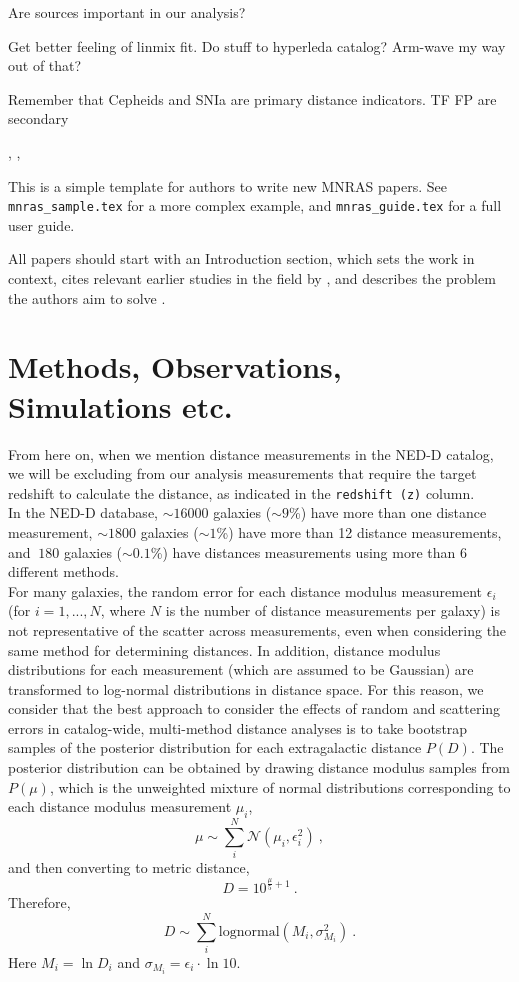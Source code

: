 \documentclass[a4paper,fleqn,usenatbib]{mnras}
\begin{document}
Are \citet{2mass} sources important in our analysis?

Get better feeling of linmix fit. Do stuff to hyperleda catalog? Arm-wave my way out of that?

Remember that Cepheids and SNIa are primary distance indicators. TF FP are secondary 


\citet{tf07dist}



 \citet{chaparro18}, \citet{tecciencia}, \citet{gelmanppd} \citet{brooks} \citet{tforig}



This is a simple template for authors to write new MNRAS papers.
See \texttt{mnras\_sample.tex} for a more complex example, and \texttt{mnras\_guide.tex}
for a full user guide.

All papers should start with an Introduction section, which sets the work
in context, cites relevant earlier studies in the field by \citet{photred2},
and describes the problem the authors aim to solve \citep[e.g.][]{photred1}.

\section{Methods, Observations, Simulations etc.}

From here on, when we mention distance measurements in the NED-D catalog, we will be excluding from our analysis measurements that require the target redshift to calculate the distance, as indicated in the \texttt{redshift (z)} column.\\

In the NED-D database, $\sim16000$ galaxies ($\sim9$\%) have more than one distance measurement, $\sim1800$ galaxies ($\sim1$\%) have more than 12  distance measurements, and $~180$ galaxies ($\sim0.1$\%) have distances measurements using more than 6 different methods. \\



For many galaxies, the random error for each distance modulus measurement $\epsilon_i$ (for $i=1,...,N$, where $N$ is the number of distance measurements per galaxy) is not representative of the scatter across measurements, even when considering the same method for determining distances. In addition, distance modulus distributions for each measurement (which are assumed to be Gaussian) are transformed to log-normal distributions in distance space. For this reason, we consider that the best approach to consider the effects of random and scattering errors in catalog-wide, multi-method distance analyses is to take bootstrap samples of the posterior distribution for each extragalactic distance $P(D)$. The posterior distribution can be obtained by drawing distance modulus samples from $P(\mu)$, which is the unweighted mixture of normal distributions corresponding to each distance modulus measurement $\mu_i$,
\[\mu\sim\sum_i^N \mathcal{N}(\mu_i,\epsilon_i^2)\ ,\]
and then converting to metric distance,
\[D=10^{\frac{\mu}{5}+1}\ .\]
Therefore,
\[D\sim\sum_i^N\mathrm{lognormal}(M_i,\sigma_{M_i}^2)\ .\]
Here $M_i=\ln D_i$ and $\sigma_{M_i}=\epsilon_i\cdot\ln10$.\\
\end{document}
